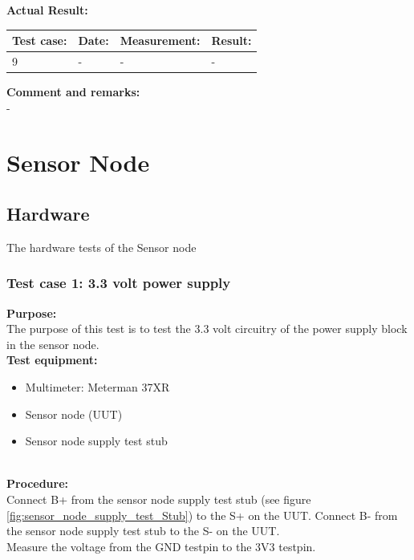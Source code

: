 \textbf{Actual Result:}\\
\begin{table}[H]
\centering
\begin{tabular}{|p{2cm}|p{2cm}|p{3cm}|p{2cm}|}\hline
\textbf{Test case:} & \textbf{Date:} & \textbf{Measurement:} & \textbf{Result:} \\ \hline
9 & - & - & - \\ \hline
\end{tabular}
\end{table}

\textbf{Comment and remarks:}\\
-\\

\section{Sensor Node}
\subsection{Hardware}
The hardware tests of the Sensor node
\subsubsection{Test case 1: 3.3 volt power supply}
\textbf{Purpose:}\\
The purpose of this test is to test the 3.3 volt circuitry of the power supply block in the sensor node.\\

\textbf{Test equipment:}
\begin{itemize}
\item Multimeter: Meterman 37XR
\item Sensor node (UUT)
\item Sensor node supply test stub
\end{itemize}
\ \\
\textbf{Procedure:}\\
Connect B+ from the sensor node supply test stub (see figure \ref{fig:sensor_node_supply_test_Stub}) to the S+ on the UUT. Connect B- from the sensor node supply test stub to the S- on the UUT.\\
Measure the voltage from the GND testpin to the 3V3 testpin.

